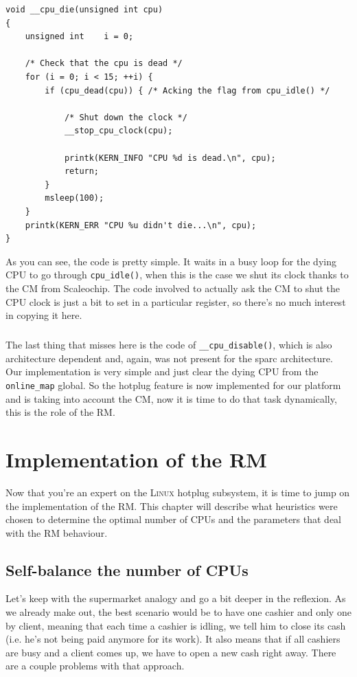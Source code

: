 \documentclass{report}
\renewcommand{\tt}[1]{\texttt{{{#1}}}}
\begin{document}
\begin{lstlisting}[caption=\tt{\_\_cpu\_die()}{{,}} \tt{arch/sparc/smp.c},label=die]
void __cpu_die(unsigned int cpu)
{
	unsigned int	i = 0;

	/* Check that the cpu is dead */
	for (i = 0; i < 15; ++i) {
		if (cpu_dead(cpu)) { /* Acking the flag from cpu_idle() */

			/* Shut down the clock */
			__stop_cpu_clock(cpu);

			printk(KERN_INFO "CPU %d is dead.\n", cpu);
			return;
		}
		msleep(100);
	}
 	printk(KERN_ERR "CPU %u didn't die...\n", cpu);
}
\end{lstlisting}

As you can see, the code is pretty simple. It waits in a busy loop for the
dying CPU to go through \tt{cpu\_idle()}, when this is the case we shut its
clock thanks to the CM from Scaleochip. The code involved to actually ask the
CM to shut the CPU clock is just a bit to set in a particular register, so
there's no much interest in copying it here.

\paragraph{}
The last thing that misses here is the code of \tt{\_\_cpu\_disable()}, which
is also architecture dependent and, again, was not present for the sparc
architecture. Our implementation is very simple and just clear the dying CPU
from the \tt{online\_map} global. So the hotplug feature is now implemented
for our platform and is taking into account the CM, now it is time to do that
task dynamically, this is the role of the RM.

\chapter{Implementation of the RM}

Now that you're an expert on the \textsc{Linux} hotplug subsystem, it is time
to jump on the implementation of the RM. This chapter will describe what
heuristics were chosen to determine the optimal number of CPUs and the
parameters that deal with the RM behaviour.

\section{Self-balance the number of CPUs}

Let's keep with the supermarket analogy and go a bit deeper in the
reflexion. As we already make out, the best scenario would be to have one
cashier and only one by client, meaning that each time a cashier is idling, we
tell him to close its cash (i.e. he's not being paid anymore for its work). It
also means that if all cashiers are busy and a client comes up, we have to open
a new cash right away. There are a couple problems with that approach.
\end{document}
